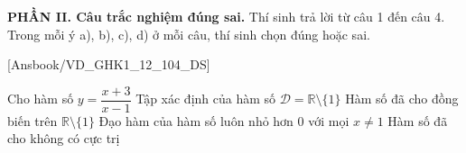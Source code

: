 \documentclass[12pt,a4paper,openany,oneside]{book}
\newcommand{\phanDe}[1]{\par\medskip\noindent #1\par\smallskip}
\begin{document}

\phanDe{\textbf{PHẦN II. Câu trắc nghiệm đúng sai.} Thí sinh trả lời từ câu 1 đến câu 4. Trong mỗi ý a), b), c), d) ở mỗi câu, thí sinh chọn đúng hoặc sai.}

\setcounter{ex}{0}

[Ansbook/VD_GHK1_12_104_DS]

\begin{ex}%
		Cho hàm số  $y=\dfrac{x+3}{x-1}$
	 \choiceTF
			{\True Tập  xác định của hàm số $\mathscr{D} = \mathbb{R} \setminus \{1 \}$}
			{Hàm số đã cho đồng biến trên  $\mathbb{R} \setminus \{1 \}$}
			{\True Đạo hàm của  hàm số luôn nhỏ hơn $0$ với mọi $x \neq 1$}
			{\True Hàm  số đã cho không có cực trị}
	\end{ex}
\end{document}
